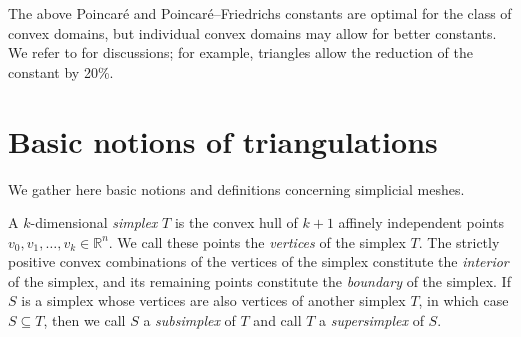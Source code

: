 \documentclass[10pt,a4paper]{article}
\newcommand{\notice}[1]{{\color{red}REMARK: #1}}
\begin{document}

\begin{remark}
    The above Poincar\'e and Poincar\'e--Friedrichs constants are optimal for the class of convex domains, 
    but individual convex domains may allow for better constants.
    We refer to \cite{Liu_Kik_interp_10, Cars_Ged_Rim_expl_cnst_12, matculevich2016explicit} for discussions;
    for example, triangles allow the reduction of the constant by 20\%.
\end{remark}


































\section{Basic notions of triangulations}\label{section:triangulations}

We gather here basic notions and definitions concerning simplicial meshes. 
  

A ${k}$-dimensional \emph{simplex} $T$ is the convex hull of ${k}+1$ affinely independent points $v_0, v_1, \ldots, v_{{k}} \in \mathbb{R}^{n}$. We call these points the \emph{vertices} of the simplex $T$. 
The strictly positive convex combinations of the vertices of the simplex constitute the \emph{ interior} of the simplex,
and its remaining points constitute the \emph{boundary} of the simplex.
If $S$ is a simplex whose vertices are also vertices of another simplex $T$, in which case $S \subseteq T$, 
then we call $S$ a \emph{subsimplex} of $T$ and call $T$ a \emph{supersimplex} of $S$. 
\end{document}
